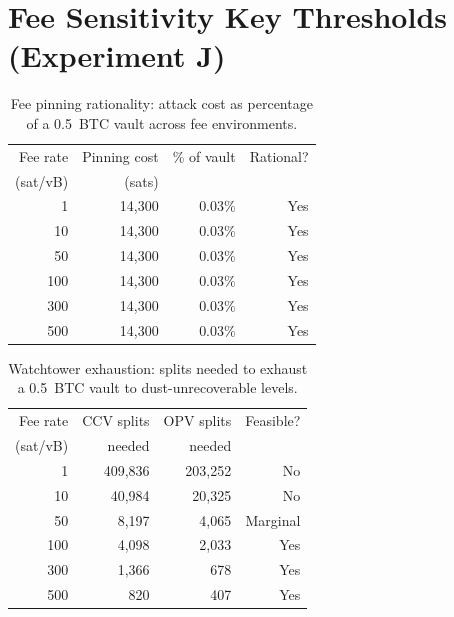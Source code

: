 \section{Fee Sensitivity Key Thresholds (Experiment J)}

\begin{table}[h]
\centering
\caption{Fee pinning rationality: attack cost as percentage of a 0.5~BTC vault
across fee environments.}
\label{tab:app_fee_pinning}
\begin{tabular}{@{}rrrr@{}}
\toprule
Fee rate & Pinning cost & \% of vault & Rational? \\
(sat/vB) & (sats)       &             & \\
\midrule
1   & 14{,}300  & 0.03\% & Yes \\
10  & 14{,}300  & 0.03\% & Yes \\
50  & 14{,}300  & 0.03\% & Yes \\
100 & 14{,}300  & 0.03\% & Yes \\
300 & 14{,}300  & 0.03\% & Yes \\
500 & 14{,}300  & 0.03\% & Yes \\
\bottomrule
\end{tabular}
\end{table}

\begin{table}[h]
\centering
\caption{Watchtower exhaustion: splits needed to exhaust a 0.5~BTC vault to
dust-unrecoverable levels.}
\label{tab:app_exhaustion}
\begin{tabular}{@{}rrrr@{}}
\toprule
Fee rate & CCV splits & OPV splits & Feasible? \\
(sat/vB) & needed     & needed     & \\
\midrule
1   & 409{,}836 & 203{,}252 & No \\
10  & 40{,}984  & 20{,}325  & No \\
50  & 8{,}197   & 4{,}065   & Marginal \\
100 & 4{,}098   & 2{,}033   & Yes \\
300 & 1{,}366   & 678       & Yes \\
500 & 820       & 407       & Yes \\
\bottomrule
\end{tabular}
\end{table}
